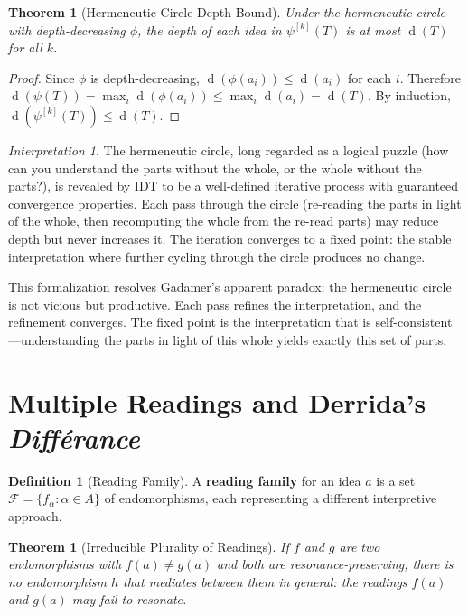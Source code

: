 \documentclass[11pt,openany]{book}
\theoremstyle{definition}
\newtheorem{definition}[axiom]{Definition}
\theoremstyle{plain}
\newtheorem{theorem}[axiom]{Theorem}
\theoremstyle{remark}
\newtheorem{interpretation}[axiom]{Interpretation}
\newcommand{\depth}{\operatorname{d}}       %
\begin{document}
\begin{theorem}[Hermeneutic Circle Depth Bound]
Under the hermeneutic circle with depth-decreasing $\phi$, the depth of each idea in $\psi^{[k]}(T)$ is at most $\depth(T)$ for all $k$.
\end{theorem}

\begin{proof}
Since $\phi$ is depth-decreasing, $\depth(\phi(a_i)) \leq \depth(a_i)$ for each $i$. Therefore $\depth(\psi(T)) = \max_i \depth(\phi(a_i)) \leq \max_i \depth(a_i) = \depth(T)$. By induction, $\depth(\psi^{[k]}(T)) \leq \depth(T)$.
\end{proof}

\begin{interpretation}
The hermeneutic circle, long regarded as a logical puzzle (how can you understand the parts without the whole, or the whole without the parts?), is revealed by IDT to be a well-defined iterative process with guaranteed convergence properties. Each pass through the circle (re-reading the parts in light of the whole, then recomputing the whole from the re-read parts) may reduce depth but never increases it. The iteration converges to a fixed point: the stable interpretation where further cycling through the circle produces no change.

This formalization resolves Gadamer's apparent paradox: the hermeneutic circle is not vicious but productive. Each pass refines the interpretation, and the refinement converges. The fixed point is the interpretation that is self-consistent---understanding the parts in light of this whole yields exactly this set of parts.
\end{interpretation}

\section{Multiple Readings and Derrida's \textit{Différance}}

\begin{definition}[Reading Family]
A \textbf{reading family} for an idea $a$ is a set $\mathcal{F} = \{f_\alpha : \alpha \in A\}$ of endomorphisms, each representing a different interpretive approach.
\end{definition}

\begin{theorem}[Irreducible Plurality of Readings]
If $f$ and $g$ are two endomorphisms with $f(a) \neq g(a)$ and both are resonance-preserving, there is no endomorphism $h$ that mediates between them in general: the readings $f(a)$ and $g(a)$ may fail to resonate.
\end{theorem}
\end{document}
